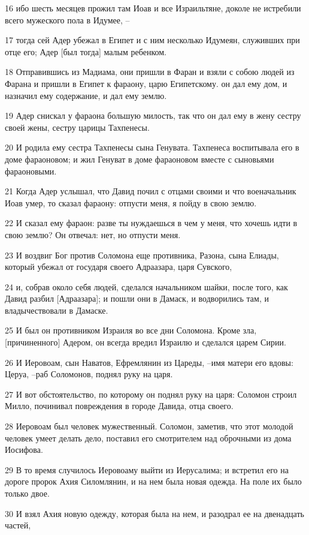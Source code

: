 \par 16 ибо шесть месяцев прожил там Иоав и все Израильтяне, доколе не истребили всего мужеского пола в Идумее, --
\par 17 тогда сей Адер убежал в Египет и с ним несколько Идумеян, служивших при отце его; Адер [был тогда] малым ребенком.
\par 18 Отправившись из Мадиама, они пришли в Фаран и взяли с собою людей из Фарана и пришли в Египет к фараону, царю Египетскому. он дал ему дом, и назначил ему содержание, и дал ему землю.
\par 19 Адер снискал у фараона большую милость, так что он дал ему в жену сестру своей жены, сестру царицы Тахпенесы.
\par 20 И родила ему сестра Тахпенесы сына Генувата. Тахпенеса воспитывала его в доме фараоновом; и жил Генуват в доме фараоновом вместе с сыновьями фараоновыми.
\par 21 Когда Адер услышал, что Давид почил с отцами своими и что военачальник Иоав умер, то сказал фараону: отпусти меня, я пойду в свою землю.
\par 22 И сказал ему фараон: разве ты нуждаешься в чем у меня, что хочешь идти в свою землю? Он отвечал: нет, но отпусти меня.
\par 23 И воздвиг Бог против Соломона еще противника, Разона, сына Елиады, который убежал от государя своего Адраазара, царя Сувского,
\par 24 и, собрав около себя людей, сделался начальником шайки, после того, как Давид разбил [Адраазара]; и пошли они в Дамаск, и водворились там, и владычествовали в Дамаске.
\par 25 И был он противником Израиля во все дни Соломона. Кроме зла, [причиненного] Адером, он всегда вредил Израилю и сделался царем Сирии.
\par 26 И Иеровоам, сын Наватов, Ефремлянин из Цареды, --имя матери его вдовы: Церуа, --раб Соломонов, поднял руку на царя.
\par 27 И вот обстоятельство, по которому он поднял руку на царя: Соломон строил Милло, починивал повреждения в городе Давида, отца своего.
\par 28 Иеровоам был человек мужественный. Соломон, заметив, что этот молодой человек умеет делать дело, поставил его смотрителем над оброчными из дома Иосифова.
\par 29 В то время случилось Иеровоаму выйти из Иерусалима; и встретил его на дороге пророк Ахия Силомлянин, и на нем была новая одежда. На поле их было только двое.
\par 30 И взял Ахия новую одежду, которая была на нем, и разодрал ее на двенадцать частей,
